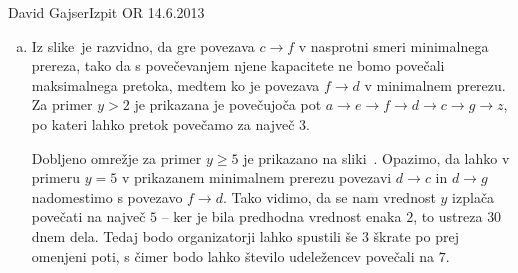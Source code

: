 \begin{naloga}{David Gajser}{Izpit OR 14.6.2013}
\begin{odgovor}
\begin{enumerate}[(a)]
\item Iz slike~ je razvidno,
da gre povezava $c \to f$ v nasprotni smeri minimalnega prereza,
tako da s povečevanjem njene kapacitete ne bomo povečali maksimalnega pretoka,
medtem ko je povezava $f \to d$ v minimalnem prerezu.
Za primer $y > 2$ je prikazana je povečujoča pot
$a \to e \to f \to d \to c \to g \to z$,
po kateri lahko pretok povečamo za največ $3$.

Dobljeno omrežje za primer $y \ge 5$ je prikazano na sliki~.
Opazimo,
da lahko v primeru $y = 5$ v prikazanem minimalnem prerezu
povezavi $d \to c$ in $d \to g$ nadomestimo s povezavo $f \to d$.
Tako vidimo, da se nam vrednost $y$ izplača povečati na največ $5$
-- ker je bila predhodna vrednost enaka $2$,
to ustreza $30$ dnem dela.
Tedaj bodo organizatorji lahko spustili še $3$ škrate po prej omenjeni poti,
s čimer bodo lahko število udeležencev povečali na $7$.
\end{enumerate}

\begin{slika}
\end{slika}
\begin{slika}
\end{slika}
\begin{slika}
\end{slika}
\begin{slika}
\end{slika}
\end{odgovor}
\end{naloga}
